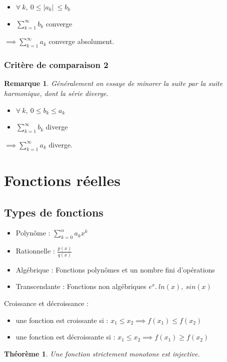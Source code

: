 \documentclass{article}
\newtheorem{remark}{Remarque}[section]
\newtheorem{theorem}{Théorème}
\begin{document}
\begin{itemize}
    \item $ \forall\ k,\ 0 \leq \lvert a_k \lvert\ \leq b_k $
    \item $ \sum_{k=1}^{\infty} b_k $ converge
\end{itemize}

$ \implies \sum_{k=1}^{\infty} a_k $ converge absolument.

\subsubsection{Critère de comparaison 2}

\begin{remark}
    Généralement on essaye de minorer la suite par la suite harmonique, dont la série diverge.
\end{remark}

\begin{itemize}
    \item $ \forall\ k,\ 0 \leq b_k \leq a_k $
    \item $ \sum_{k=1}^{\infty} b_k $ diverge
\end{itemize}

$ \implies \sum_{k=1}^{\infty} a_k $ diverge.

\section{Fonctions réelles}
\subsection{Types de fonctions}
\begin{itemize}
    \item Polynôme : $ \sum_{k = 0}^{n}a_kx^k $
    \item Rationnelle : $ \frac{p(x)}{q(x)} $
    \item Algébrique : Fonctions polynômes et un nombre fini d'opérations
    \item Transcendante : Fonctions non algébriques $e^x.\ ln(x),\ sin(x)$
\end{itemize}
Croissance et décroissance :
\begin{itemize}
    \item une fonction est croissante si : $ x_1 \leq x_2 \implies f(x_1) \leq f(x_2) $
    \item une fonction est décroissante si : $ x_1 \leq x_2 \implies f(x_1) \geq f(x_2) $
\end{itemize}
\begin{theorem}
    Une fonction strictement monotone est injective.
\end{theorem}
\end{document}
